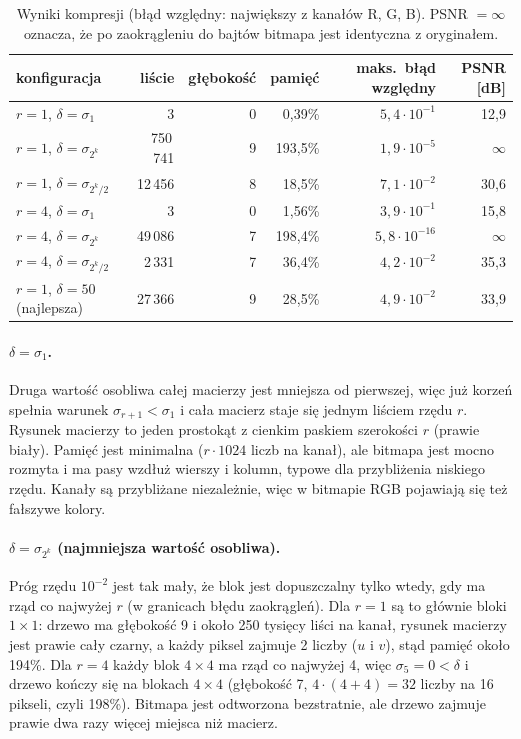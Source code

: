 \documentclass[11pt,a4paper]{article}
\begin{document}
\begin{table}[H]
\centering
\begin{tabular}{@{}lrrrrr@{}}
\toprule
konfiguracja & liście & głębokość & pamięć & maks.\ błąd względny & PSNR [dB]\\
\midrule
$r=1$, $\delta=\sigma_1$          & 3        & 0 & 0{,}39\%  & $5{,}4\cdot10^{-1}$  & 12{,}9\\
$r=1$, $\delta=\sigma_{2^k}$      & 750\,741 & 9 & 193{,}5\% & $1{,}9\cdot10^{-5}$  & $\infty$\\
$r=1$, $\delta=\sigma_{2^k/2}$    & 12\,456  & 8 & 18{,}5\%  & $7{,}1\cdot10^{-2}$  & 30{,}6\\
$r=4$, $\delta=\sigma_1$          & 3        & 0 & 1{,}56\%  & $3{,}9\cdot10^{-1}$  & 15{,}8\\
$r=4$, $\delta=\sigma_{2^k}$      & 49\,086  & 7 & 198{,}4\% & $5{,}8\cdot10^{-16}$ & $\infty$\\
$r=4$, $\delta=\sigma_{2^k/2}$    & 2\,331   & 7 & 36{,}4\%  & $4{,}2\cdot10^{-2}$  & 35{,}3\\
\midrule
$r=1$, $\delta=50$ (najlepsza)    & 27\,366  & 9 & 28{,}5\%  & $4{,}9\cdot10^{-2}$  & 33{,}9\\
\bottomrule
\end{tabular}
\caption{Wyniki kompresji (błąd względny: największy z kanałów R, G, B). PSNR $=\infty$ oznacza, że po zaokrągleniu do bajtów bitmapa jest identyczna z oryginałem.}
\label{tab:wyniki}
\end{table}

\paragraph{$\delta=\sigma_1$.} Druga wartość osobliwa całej macierzy jest mniejsza od pierwszej, więc już korzeń
spełnia warunek $\sigma_{r+1}<\sigma_1$ i cała macierz staje się jednym liściem rzędu $r$. Rysunek macierzy to jeden
prostokąt z cienkim paskiem szerokości $r$ (prawie biały). Pamięć jest minimalna ($r\cdot1024$ liczb na kanał), ale
bitmapa jest mocno rozmyta i ma pasy wzdłuż wierszy i kolumn, typowe dla przybliżenia niskiego rzędu. Kanały są
przybliżane niezależnie, więc w bitmapie RGB pojawiają się też fałszywe kolory.

\paragraph{$\delta=\sigma_{2^k}$ (najmniejsza wartość osobliwa).} Próg rzędu $10^{-2}$ jest tak mały, że blok jest
dopuszczalny tylko wtedy, gdy ma rząd co najwyżej $r$ (w granicach błędu zaokrągleń). Dla $r=1$ są to głównie bloki
$1\times1$: drzewo ma głębokość 9 i około 250 tysięcy liści na kanał, rysunek macierzy jest prawie cały czarny, a każdy
piksel zajmuje 2 liczby ($u$ i $v$), stąd pamięć około 194\%. Dla $r=4$ każdy blok $4\times4$ ma rząd co najwyżej 4,
więc $\sigma_5=0<\delta$ i drzewo kończy się na blokach $4\times4$ (głębokość 7, $4\cdot(4+4)=32$ liczby na 16
pikseli, czyli 198\%). Bitmapa jest odtworzona bezstratnie, ale drzewo zajmuje prawie dwa razy więcej miejsca niż
macierz.
\end{document}
